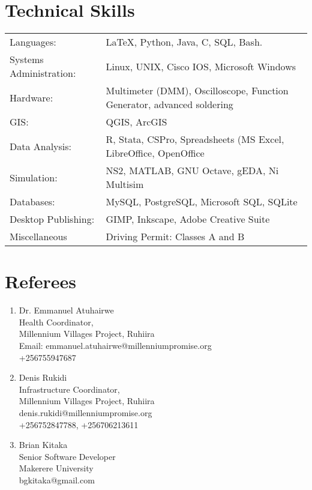 \documentclass[12pt,a4paper]{article}
\begin{document}
\section*{Technical Skills}
\begin{tabulary}{\linewidth}{L L}
Languages: & \LaTeX, Python, Java, C, SQL, Bash.\\
Systems Administration: & Linux, UNIX, Cisco IOS, Microsoft Windows\\
Hardware: & Multimeter (DMM), Oscilloscope, Function Generator, advanced soldering\\
GIS: & QGIS, ArcGIS \\
Data Analysis: & R, Stata, CSPro, Spreadsheets (MS Excel, LibreOffice, OpenOffice \\
Simulation: & NS2, MATLAB, GNU Octave, gEDA, Ni Multisim \\
Databases: & MySQL, PostgreSQL, Microsoft SQL, SQLite \\
Desktop Publishing: & GIMP, Inkscape, Adobe Creative Suite \\
Miscellaneous & Driving Permit: Classes A and  B \\
\end{tabulary}

\section*{Referees}
  \begin{enumerate}
    \item Dr. Emmanuel Atuhairwe\\
          Health Coordinator,\\
          Millennium Villages Project, Ruhiira\\
          Email: emmanuel.atuhairwe@millenniumpromise.org\\
          +256755947687
          
    \item Denis Rukidi\\
          Infrastructure Coordinator,\\
          Millennium Villages Project, Ruhiira\\
          denis.rukidi@millenniumpromise.org \\
          +256752847788, +256706213611

    \item Brian Kitaka \\
    	  Senior Software Developer \\
    	  Makerere University \\
    	  bgkitaka@gmail.com
  \end{enumerate}
\medskip
\end{document}
